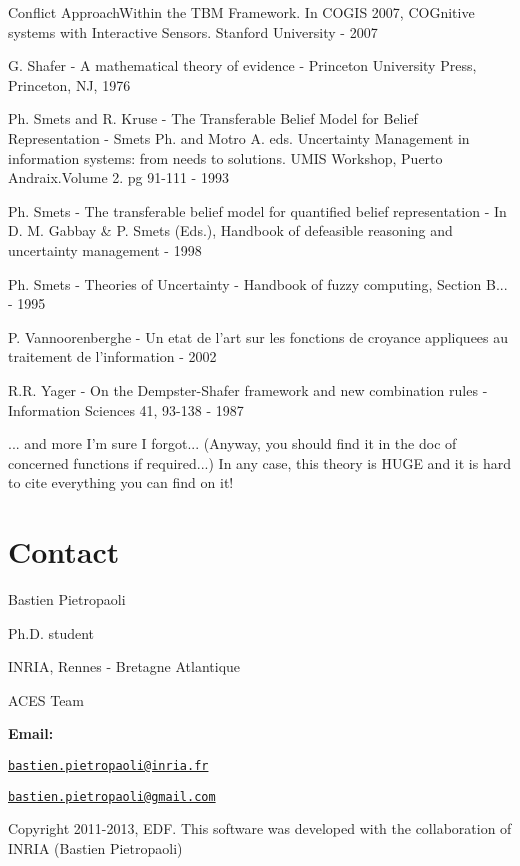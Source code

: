 \begin{DoxyItemize}
Conflict Approach\-Within the T\-B\-M Framework. In C\-O\-G\-I\-S 2007, C\-O\-Gnitive systems with Interactive Sensors. Stanford University -\/ 2007 \item G. Shafer -\/ A mathematical theory of evidence -\/ Princeton University Press, Princeton, N\-J, 1976 \item Ph. Smets and R. Kruse -\/ The Transferable Belief Model for Belief Representation -\/ Smets Ph. and Motro A. eds. Uncertainty Management in information systems\-: from needs to solutions. U\-M\-I\-S Workshop, Puerto Andraix.\-Volume 2. pg 91-\/111 -\/ 1993 \item Ph. Smets -\/ The transferable belief model for quantified belief representation -\/ In D. M. Gabbay \& P. Smets (Eds.), Handbook of defeasible reasoning and uncertainty management -\/ 1998 \item Ph. Smets -\/ Theories of Uncertainty -\/ Handbook of fuzzy computing, Section B... -\/ 1995 \item P. Vannoorenberghe -\/ Un etat de l'art sur les fonctions de croyance appliquees au traitement de l'information -\/ 2002 \item R.\-R. Yager -\/ On the Dempster-\/\-Shafer framework and new combination rules -\/ Information Sciences 41, 93-\/138 -\/ 1987 \item ... and more I'm sure I forgot... (Anyway, you should find it in the doc of concerned functions if required...) In any case, this theory is H\-U\-G\-E and it is hard to cite everything you can find on it!\end{DoxyItemize}
\hypertarget{index_contact_sec}{}\section{Contact}\label{index_contact_sec}
Bastien Pietropaoli \par
 Ph.\-D. student \par
 I\-N\-R\-I\-A, Rennes -\/ Bretagne Atlantique \par
 A\-C\-E\-S Team \par


{\bfseries Email\-:} \par
 \href{mailto:bastien.pietropaoli@inria.fr}{\tt bastien.\-pietropaoli@inria.\-fr} \par
 \href{mailto:bastien.pietropaoli@gmail.com}{\tt bastien.\-pietropaoli@gmail.\-com} \par


Copyright 2011-\/2013, E\-D\-F. This software was developed with the collaboration of I\-N\-R\-I\-A (Bastien Pietropaoli) 